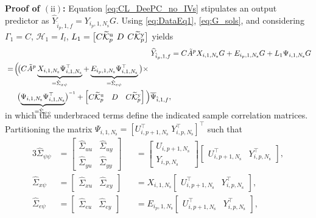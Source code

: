 \noindent\textbf{Proof of $(\mathrm{ii})$:} Equation \eqref{eq:CL_DeePC_no_IVs} stipulates an output predictor as $\widehat{Y}_{\hat{i}_p,1,f}=Y_{i_p,1,N_\mathrm{s}}G$. %
Using \eqref{eq:DataEq1}, \eqref{eq:G_sols}, and considering $\Gamma_1=C$, $\mathcal{H}_1=I_l$, $L_1=\big[C\widetilde{\mathcal{K}}_{p}^{\mathrm{{u}}} \;\;\! D \;\;\! C\widetilde{\mathcal{K}}_{p}^{\mathrm{{y}}}\big]$ yields
\begin{align}
    \mkern-6mu\widehat{Y}_{\hat{i}_p,1,f} &= C \tilde{A}^p X_{i,1,N_\mathrm{s}}G + E_{i_p,1,N_\mathrm{s}}G + L_1 \Psi_{i,1,N_\mathrm{s}}G\notag\\
    \begin{split}
        &=\!\Big(\!\big(C \tilde{A}^p \underbrace{X_{i,1,N_\mathrm{s}}\Psi_{i,1,N_\mathrm{s}}^\top}_{=\hat{\Sigma}_{x\psi}} + \underbrace{E_{i_p,1,N_\mathrm{s}}\Psi_{i,1,N_\mathrm{s}}^\top}_{=\hat{\Sigma}_{e\psi}}\big)\times\\
        &\phantom{==}\big(\smash{\underbrace{\Psi_{i,1,N_\mathrm{s}}\Psi_{i,1,N_\mathrm{s}}^\top}_{=\hat{\Sigma}_{\psi\psi}}}\big)\inv+\begin{bmatrix}C\tKp{u} & D & C\tKp{y}\end{bmatrix}\Big)\overline{\Psi}_{\hat{i},1,f},
    \end{split}\label{eq:Yfhat_1}
\end{align}
in which the underbraced terms define the indicated sample correlation matrices. Partitioning the matrix $\Psi_{i,1,N_\mathrm{s}}=[U_{i,p+1,N_\mathrm{s}}^\top\;Y_{i,p,N_\mathrm{s}}^\top]^\top$ such that
\begin{alignat*}{3}
    \hat{\Sigma}_{\psi\psi}&=\begin{bmatrix}
        \hat{\Sigma}_{uu} & \hat{\Sigma}_{uy}\\
        \hat{\Sigma}_{yu} & \hat{\Sigma}_{yy}
    \end{bmatrix} &&= \begin{bmatrix} U_{i,p+1,N_\mathrm{s}} \\ Y_{i,p,N_\mathrm{s}} \end{bmatrix}\begin{bmatrix} U_{i,p+1,N_\mathrm{s}}^\top & Y_{i,p,N_\mathrm{s}}^\top \end{bmatrix},\\
    \hat{\Sigma}_{x\psi}&=\begin{bmatrix}
        \hat{\Sigma}_{xu} & \hat{\Sigma}_{xy}
    \end{bmatrix} &&= X_{i,1,N_\mathrm{s}}\begin{bmatrix} U_{i,p+1,N_\mathrm{s}}^\top & Y_{i,p,N_\mathrm{s}}^\top \end{bmatrix},\\
    \hat{\Sigma}_{e\psi}&=\begin{bmatrix}
        \hat{\Sigma}_{eu} & \hat{\Sigma}_{ey}
    \end{bmatrix} &&= E_{i_p,1,N_\mathrm{s}}\begin{bmatrix} U_{i,p+1,N_\mathrm{s}}^\top & Y_{i,p,N_\mathrm{s}}^\top \end{bmatrix},
\end{alignat*}
